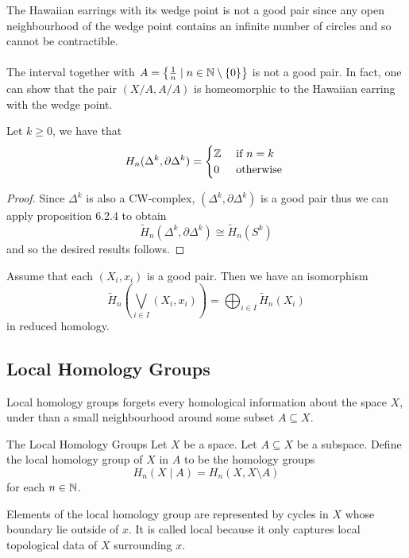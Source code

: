\documentclass[a4paper]{article}
\begin{document}
The Hawaiian earrings with its wedge point is not a good pair since any open neighbourhood of the wedge point contains an infinite number of circles and so cannot be contractible. \\~\\

The interval together with $A=\left\{\frac{1}{n}\;|\;n\in\mathbb{N}\setminus\{0\}\right\}$ is not a good pair. In fact, one can show that the pair $(X/A,A/A)$ is homeomorphic to the Hawaiian earring with the wedge point. 

\begin{prp}{}{} Let $k\geq 0$, we have that $$H_n(\Delta^k,\partial\Delta^k)=\begin{cases}
\mathbb{Z} & \text{ if } n=k\\
0 & \text{ otherwise }
\end{cases}$$ \tcbline
\begin{proof}
Since $\Delta^k$ is also a CW-complex, $(\Delta^k,\partial\Delta^k)$ is a good pair thus we can apply proposition 6.2.4 to obtain $$\widetilde{H}_n(\Delta^k,\partial\Delta^k)\cong\tilde{H}_n(S^k)$$ and so the desired results follows. 
\end{proof}
\end{prp}

\begin{lmm}{}{} Assume that each $(X_i,x_i)$ is a good pair. Then we have an isomorphism $$\widetilde{H}_n\left(\bigvee_{i\in I}(X_i,x_i)\right)=\bigoplus_{i\in I}\widetilde{H}_n(X_i)$$ in reduced homology. 
\end{lmm}

\subsection{Local Homology Groups}
Local homology groups forgets every homological information about the space $X$, under than a small neighbourhood around some subset $A\subseteq X$. 

\begin{defn}{The Local Homology Groups}{} Let $X$ be a space. Let $A\subseteq X$ be a subspace. Define the local homology group of $X$ in $A$ to be the homology groups $$H_n(X\;|\;A)=H_n(X,X\setminus A)$$ for each $n\in\mathbb{N}$. 
\end{defn}

Elements of the local homology group are represented by cycles in $X$ whose boundary lie outside of $x$. It is called local because it only captures local topological data of $X$ surrounding $x$. 
\end{document}
